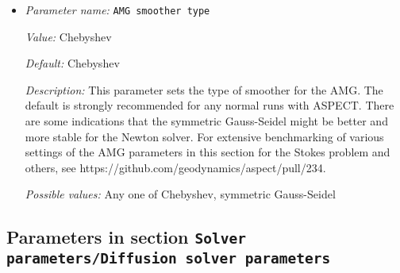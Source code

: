 \begin{itemize}
{\it Default:} 2


{\it Description:} Determines how many sweeps of the smoother should be performed. When the flag elliptic is set to true, (which is true for ASPECT), the polynomial degree of the Chebyshev smoother is set to this value. The term sweeps refers to the number of matrix-vector products performed in the Chebyshev case. In the non-elliptic case, this parameter sets the number of SSOR relaxation sweeps for post-smoothing to be performed. The default is strongly recommended. There are indications that for the Newton solver a different value might be better. For extensive benchmarking of various settings of the AMG parameters in this section for the Stokes problem and others, see https://github.com/geodynamics/aspect/pull/234.


{\it Possible values:} An integer $n$ such that $0\leq n \leq 2147483647$
\item {\it Parameter name:} {\tt AMG smoother type}
\label{parameters:Solver parameters/AMG parameters/AMG smoother type}


{\it Value:} Chebyshev


{\it Default:} Chebyshev


{\it Description:} This parameter sets the type of smoother for the AMG. The default is strongly recommended for any normal runs with ASPECT. There are some indications that the symmetric Gauss-Seidel might be better and more stable for the Newton solver. For extensive benchmarking of various settings of the AMG parameters in this section for the Stokes problem and others, see https://github.com/geodynamics/aspect/pull/234.


{\it Possible values:} Any one of Chebyshev, symmetric Gauss-Seidel
\end{itemize}

\subsection{Parameters in section \tt Solver parameters/Diffusion solver parameters}
\label{parameters:Solver_20parameters/Diffusion_20solver_20parameters}

